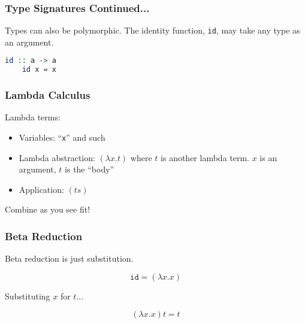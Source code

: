 \documentclass{beamer}
\begin{document}
\begin{frame}[fragile]
  \frametitle{Type Signatures Continued...}

  Types can also be polymorphic. The identity function, \texttt{id}, may take any type as an argument.

  \begin{lstlisting}[frame=single, language=Haskell, breaklines=true]
    id :: a -> a
    id x = x
  \end{lstlisting}
\end{frame}

\begin{frame}[fragile]
  \frametitle{Lambda Calculus}

  Lambda terms:

  \begin{itemize}
  \item Variables: ``\texttt{x}'' and such
  \item Lambda abstraction: $(\lambda x . t)$ where $t$ is another lambda term. $x$ is an argument, $t$ is the ``body''
  \item Application: $(ts)$
  \end{itemize}

  Combine as you see fit!
\end{frame}

\begin{frame}[fragile]
  \frametitle{Beta Reduction}

  Beta reduction is just substitution.

  \[\mathtt{id} = (\lambda x . x)\]

  Substituting $x$ for $t$...

  \[(\lambda x . x) t = t\]
\end{frame}
\end{document}
